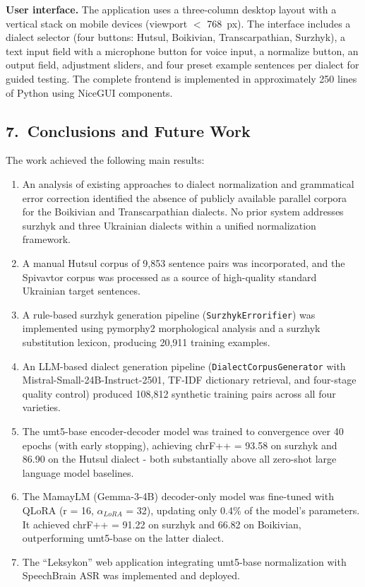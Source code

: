 \documentclass[14pt]{extarticle}
\begin{document}
\textbf{User interface.} The application uses a three-column desktop layout with a vertical
stack on mobile devices (viewport $<$ 768~px). The interface includes a dialect selector
(four buttons: Hutsul, Boikivian, Transcarpathian, Surzhyk), a text input field with a
microphone button for voice input, a normalize button, an output field, adjustment sliders,
and four preset example sentences per dialect for guided testing. The complete frontend is
implemented in approximately 250 lines of Python using NiceGUI components.

\subsection*{7.~Conclusions and Future Work}

The work achieved the following main results:

\begin{enumerate}
  \item An analysis of existing approaches to dialect normalization and grammatical error
  correction identified the absence of publicly available parallel corpora for the Boikivian
  and Transcarpathian dialects. No prior system addresses surzhyk and three Ukrainian dialects
  within a unified normalization framework.

  \item A manual Hutsul corpus of 9,853 sentence pairs was incorporated, and the Spivavtor
  corpus was processed as a source of high-quality standard Ukrainian target sentences.

  \item A rule-based surzhyk generation pipeline (\texttt{SurzhykErrorifier}) was implemented
  using pymorphy2 morphological analysis and a surzhyk substitution lexicon, producing 20,911
  training examples.

  \item An LLM-based dialect generation pipeline (\texttt{DialectCorpusGenerator} with
  Mistral-Small-24B-Instruct-2501, TF-IDF dictionary retrieval, and four-stage quality control)
  produced 108,812 synthetic training pairs across all four varieties.

  \item The umt5-base encoder-decoder model was trained to convergence over 40 epochs (with
  early stopping), achieving chrF++ = 93.58 on surzhyk and 86.90 on the Hutsul dialect -
  both substantially above all zero-shot large language model baselines.

  \item The MamayLM (Gemma-3-4B) decoder-only model was fine-tuned with QLoRA (r = 16,
  $\alpha_{LoRA}$ = 32), updating only 0.4\% of the model's parameters. It achieved
  chrF++ = 91.22 on surzhyk and 66.82 on Boikivian, outperforming umt5-base on the latter
  dialect.

  \item The ``Leksykon'' web application integrating umt5-base normalization with SpeechBrain
  ASR was implemented and deployed.
\end{enumerate}
\end{document}
